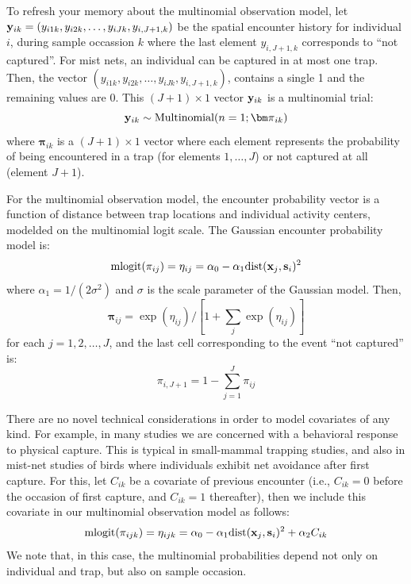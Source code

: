 To refresh your memory about the multinomial observation model, let ${\bf y}_{ik}
= (y_{i1k},y_{i2k},\ldots,y_{iJk},y_{i,J+1,k})$ be the spatial
encounter history for individual $i$, during sample occassion $k$
where the last element $y_{i,J+1,k}$ corresponds to ``not captured''.
For mist nets, an individual can be captured in at most one
trap. Then, the vector $(y_{i1k},y_{i2k},\ldots,y_{iJk},y_{i,J+1,k})$,
contains a single 1 and the remaining values are 0.  This $(J+1)\times
1$ vector ${\bf y}_{ik}$ is a multinomial trial:
\[
{\bf y}_{ik} \sim \mbox{Multinomial}(n=1; {\bm \pi}_{ik} )
\]
where ${\bm \pi}_{ik}$ is a $(J+1) \times 1$ vector where each element
represents the probability of being encountered in a trap (for
elements $1,\ldots,J$) or not captured at all (element $J+1$). 

For the multinomial observation model, the encounter probability vector is a
function of distance between trap locations and individual activity
centers, modelded on 
the multinomial logit scale. The Gaussian encounter probability model is:
\begin{equation}
\mbox{mlogit}(\pi_{ij}) = \eta_{ij}  =  \alpha_0 - \alpha_{1} \mbox{dist}({\bf x}_{j},{\bf s}_{i})^2   
\label{hscr.eq.mlogit}
\end{equation}
where $\alpha_{1} = 1/(2\sigma^2)$ and $\sigma$ is the scale
parameter of the Gaussian model. Then, 
\[
{\bm \pi}_{ij} = \exp(\eta_{ij})/[ 1 + \sum_{j} \exp(\eta_{ij}) ]
\]
for each $j=1,2,\ldots,J$, and the last cell corresponding to the
event ``not captured'' is:
\[
\pi_{i,J+1} = 1- \sum_{j=1}^{J} \pi_{ij}
\]

There are no novel technical considerations in order to model
covariates of any kind. 
For example, in many studies we are concerned with a behavioral
response to physical capture. This is typical in small-mammal trapping
studies, and also in mist-net studies of birds where individuals
exhibit net avoidance after first capture. For this, let
$C_{ik}$ be a covariate of previous encounter
(i.e., $C_{ik} = 0$ before the occasion of first capture, and $C_{ik}
= 1$ thereafter), then we include this covariate in our multinomial
observation model as follows:
\[
\mbox{mlogit}(\pi_{ijk}) = \eta_{ijk} = \alpha_{0}  - \alpha_{1}
\mbox{dist}({\bf  x}_{j},{\bf s}_{i})^2 +  \alpha_{2} C_{ik}
\]
We note that, in this case, the multinomial probabilities depend not only
on individual and trap, but also on sample occasion.






